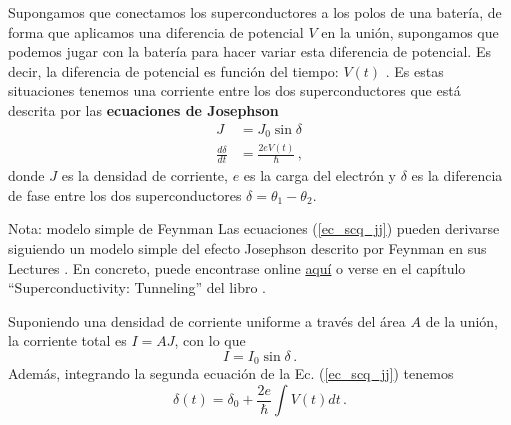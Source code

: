 Supongamos que conectamos los superconductores a los polos de una batería, de forma que aplicamos una diferencia de potencial $V$ en la unión, supongamos que podemos jugar con la batería para hacer variar esta diferencia de potencial. Es decir, la diferencia de potencial es función del tiempo: $V(t)$ . Es estas situaciones tenemos una corriente entre los dos superconductores que está descrita por las \textbf{ecuaciones de Josephson}
\begin{equation} \label{ec_scq_jj}
\begin{aligned}
J &= J_0 \sin \delta \\
\frac{d \delta}{dt} &= \frac{2eV(t)}{\hbar} \, ,
\end{aligned}
\end{equation}
donde $J$ es la densidad de corriente, $e$ es la carga del electrón y $\delta$ es la diferencia de fase entre los dos superconductores $\delta = \theta_1 - \theta_2$. 

\begin{mybox_blue}{Nota: modelo simple de Feynman}
Las ecuaciones (\ref{ec_scq_jj}) pueden derivarse siguiendo un modelo simple del efecto Josephson descrito por Feynman en sus Lectures \cite{bib_scq_Feynman_lectures}. En concreto, puede encontrase online \href{https://www.feynmanlectures.caltech.edu/III_21.html#Ch21-S9}{aquí} o verse en el capítulo ``Superconductivity: Tunneling'' del libro \cite{bib_scq_encyclopedia_of_cmp}.
\end{mybox_blue}

Suponiendo una densidad de corriente uniforme a través del área $A$ de la unión, la corriente total es $I = AJ$, con lo que
	\begin{equation}
	\boxed{I = I_0 \sin \delta} \, .
	\end{equation}
Además, integrando la segunda ecuación de la Ec. (\ref{ec_scq_jj}) tenemos
	\begin{equation}
	\boxed{\delta(t) = \delta_0 + \frac{2e}{\hbar} \int V(t)dt} \,.
	\end{equation}

